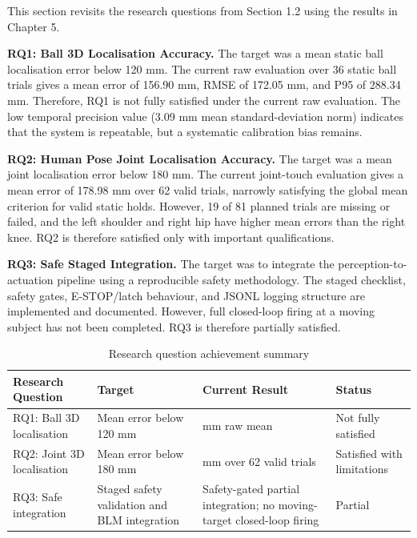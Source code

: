 This section revisits the research questions from Section 1.2 using the results in Chapter 5.

\textbf{RQ1: Ball 3D Localisation Accuracy.} The target was a mean static ball localisation error below 120 mm. The current raw evaluation over 36 static ball trials gives a mean error of 156.90 mm, RMSE of 172.05 mm, and P95 of 288.34 mm. Therefore, RQ1 is not fully satisfied under the current raw evaluation. The low temporal precision value (3.09 mm mean standard-deviation norm) indicates that the system is repeatable, but a systematic calibration bias remains.

\textbf{RQ2: Human Pose Joint Localisation Accuracy.} The target was a mean joint localisation error below 180 mm. The current joint-touch evaluation gives a mean error of 178.98 mm over 62 valid trials, narrowly satisfying the global mean criterion for valid static holds. However, 19 of 81 planned trials are missing or failed, and the left shoulder and right hip have higher mean errors than the right knee. RQ2 is therefore satisfied only with important qualifications.

\textbf{RQ3: Safe Staged Integration.} The target was to integrate the perception-to-actuation pipeline using a reproducible safety methodology. The staged checklist, safety gates, E-STOP/latch behaviour, and JSONL logging structure are implemented and documented. However, full closed-loop firing at a moving subject has not been completed. RQ3 is therefore partially satisfied.

\begin{table}[htbp]
\centering
\small
\setlength{\tabcolsep}{4pt}
\renewcommand{\arraystretch}{1.25}
\caption{Research question achievement summary}
\label{tab:6_1}
\begin{tabularx}{\textwidth}{@{}>{\raggedright\arraybackslash}p{}>{\raggedright\arraybackslash}p{}>{\raggedright\arraybackslash}X>{\raggedright\arraybackslash}p{}@{}}
\toprule
\textbf{Research Question} & \textbf{Target} & \textbf{Current Result} & \textbf{Status} \\
\midrule
RQ1: Ball 3D localisation & Mean error below 120 mm & 156.90 mm raw mean & Not fully satisfied \\
RQ2: Joint 3D localisation & Mean error below 180 mm & 178.98 mm over 62 valid trials & Satisfied with limitations \\
RQ3: Safe integration & Staged safety validation and BLM integration & Safety-gated partial integration; no moving-target closed-loop firing & Partial \\
\bottomrule
\end{tabularx}
\end{table}

